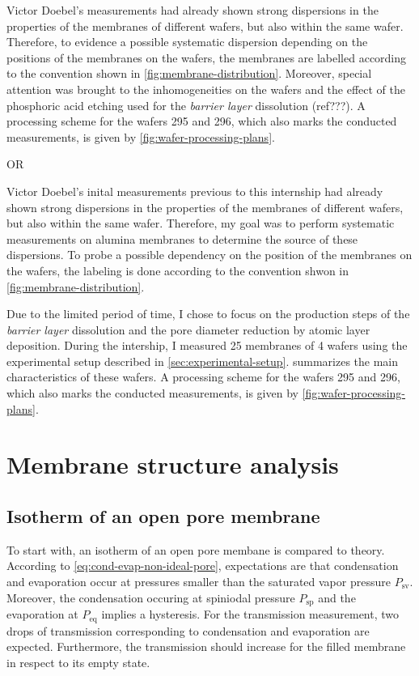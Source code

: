 \documentclass[../thesis.tex]{subfiles}
\begin{document}
        Victor Doebel's measurements had already shown strong dispersions in the properties of the membranes of different wafers, but also within the same wafer. Therefore, to evidence a possible systematic dispersion depending on the positions of the membranes on the wafers, the membranes are labelled according to the convention shown in \cref{fig:membrane-distribution}. Moreover, special attention was brought to the inhomogeneities on the wafers and the effect of the phosphoric acid etching used for the \textit{barrier layer} dissolution (ref???). A processing scheme for the wafers 295 and 296, which also marks the conducted measurements, is given by \cref{fig:wafer-processing-plans}.
        \medskip

        OR
        \medskip

        Victor Doebel's inital measurements previous to this internship had already shown strong dispersions in the properties of the membranes of different wafers, but also within the same wafer. Therefore, my goal was to perform systematic measurements on alumina membranes to determine the source of these dispersions. To probe a possible dependency on the position of the membranes on the wafers, the labeling is done according to the convention shwon in \cref{fig:membrane-distribution}.

        Due to the limited period of time, I chose to focus on the production steps of the \textit{barrier layer} dissolution and the pore diameter reduction by atomic layer deposition. During the intership, I measured 25 membranes of 4 wafers using the experimental setup described in \cref{sec:experimental-setup}.  summarizes the main characteristics of these wafers. A processing scheme for the wafers 295 and 296, which also marks the conducted measurements, is given by \cref{fig:wafer-processing-plans}.

        


    \section{Membrane structure analysis}

      \subsection{Isotherm of an open pore membrane}
      \label{subsec:open-pore-isotherm}

        To start with, an isotherm of an open pore membane is compared to theory. According to \cref{eq:cond-evap-non-ideal-pore}, expectations are that condensation and evaporation occur at pressures smaller than the saturated vapor pressure $P_\mathrm{sv}$. Moreover, the condensation occuring at spiniodal pressure $P_\mathrm{sp}$ and the evaporation at $P_\mathrm{eq}$ implies a hysteresis. For the transmission measurement, two drops of transmission corresponding to condensation and evaporation are expected. Furthermore, the transmission should increase for the filled membrane in respect to its empty state.
\end{document}
